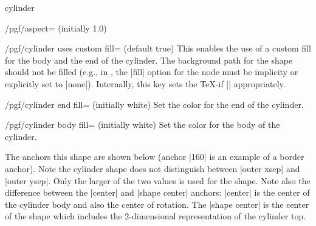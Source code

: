 \begin{shape}{cylinder}
\begin{key}{/pgf/aspect= (initially 1.0)}
\end{key}

\begin{key}{/pgf/cylinder uses custom fill= (default true)}
	This enables the use of a custom fill for the body and the end of
	the cylinder. The background path for the shape should not be
	filled (e.g., in \tikzname{}, the |fill| option for the node must
	be implicity or explicitly set to |none|).
  Internally, this key sets the \TeX-if
  |\ifpgfcylinderusescustomfill| appropriately.
\end{key}

\begin{codeexample}[]
\end{codeexample}

\begin{key}{/pgf/cylinder end fill= (initially white)}
	Set the color for the end of the cylinder.
\end{key}
\begin{key}{/pgf/cylinder body fill= (initially white)}
	Set the color for the body of the cylinder.
\end{key}


  The anchors this shape are shown below (anchor |160| is an
	example of a border anchor). Note the cylinder shape does not
	distinguish between |outer xsep| and |outer ysep|. Only the larger
	of the two values is used for the shape. Note also the difference
	between the |center| and |shape center| anchors: |center| is the
	center of the cylinder body and also the center of rotation.
	The |shape center| is the center of the shape which includes the
	2-dimensional representation of the cylinder top.	
	

\begin{codeexample}[]
\Huge
{}
\end{codeexample}


\end{shape}






